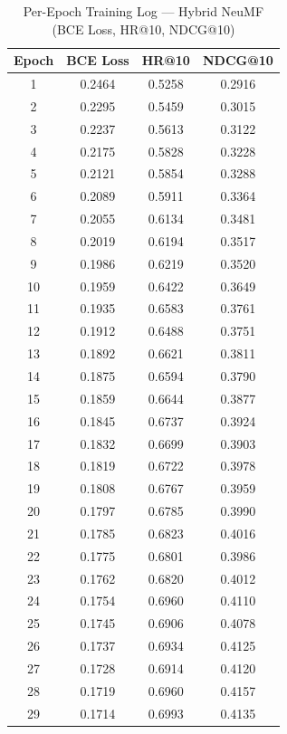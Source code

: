 \documentclass[11pt,a4paper]{article}
\begin{document}
\begin{table}[H]
  \centering
  \caption{Per-Epoch Training Log --- Hybrid NeuMF (BCE Loss, HR@10, NDCG@10)}
  \label{tab:per_epoch}
  \small
  \begin{tabular}{cccc}
    \toprule
    \textbf{Epoch} & \textbf{BCE Loss} & \textbf{HR@10} & \textbf{NDCG@10} \\
    \midrule
    1  & 0.2464 & 0.5258 & 0.2916 \\
    2  & 0.2295 & 0.5459 & 0.3015 \\
    3  & 0.2237 & 0.5613 & 0.3122 \\
    4  & 0.2175 & 0.5828 & 0.3228 \\
    5  & 0.2121 & 0.5854 & 0.3288 \\
    6  & 0.2089 & 0.5911 & 0.3364 \\
    7  & 0.2055 & 0.6134 & 0.3481 \\
    8  & 0.2019 & 0.6194 & 0.3517 \\
    9  & 0.1986 & 0.6219 & 0.3520 \\
    10 & 0.1959 & 0.6422 & 0.3649 \\
    11 & 0.1935 & 0.6583 & 0.3761 \\
    12 & 0.1912 & 0.6488 & 0.3751 \\
    13 & 0.1892 & 0.6621 & 0.3811 \\
    14 & 0.1875 & 0.6594 & 0.3790 \\
    15 & 0.1859 & 0.6644 & 0.3877 \\
    16 & 0.1845 & 0.6737 & 0.3924 \\
    17 & 0.1832 & 0.6699 & 0.3903 \\
    18 & 0.1819 & 0.6722 & 0.3978 \\
    19 & 0.1808 & 0.6767 & 0.3959 \\
    20 & 0.1797 & 0.6785 & 0.3990 \\
    21 & 0.1785 & 0.6823 & 0.4016 \\
    22 & 0.1775 & 0.6801 & 0.3986 \\
    23 & 0.1762 & 0.6820 & 0.4012 \\
    24 & 0.1754 & 0.6960 & 0.4110 \\
    25 & 0.1745 & 0.6906 & 0.4078 \\
    26 & 0.1737 & 0.6934 & 0.4125 \\
    27 & 0.1728 & 0.6914 & 0.4120 \\
    28 & 0.1719 & 0.6960 & 0.4157 \\
    29 & 0.1714 & 0.6993 & 0.4135 \\

\end{tabular}
\end{table}
\end{document}
